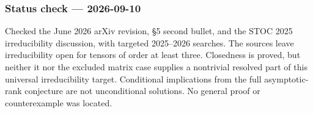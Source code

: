 \documentclass[11pt,a4paper]{article}
\begin{document}
\subsubsection{Status check ---
2026-09-10}\label{status-check-2026-09-10}

Checked the June 2026 arXiv revision, §5 second bullet, and the STOC
2025 irreducibility discussion, with targeted 2025--2026 searches. The
sources leave irreducibility open for tensors of order at least three.
Closedness is proved, but neither it nor the excluded matrix case
supplies a nontrivial resolved part of this universal irreducibility
target. Conditional implications from the full asymptotic-rank
conjecture are not unconditional solutions. No general proof or
counterexample was located.
\end{document}
